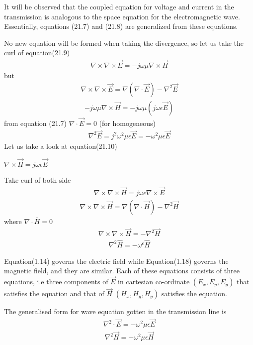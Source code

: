 It will be observed that the coupled equation for voltage and current in the transmission is analogous to the space equation for the electromagnetic wave. Essentially, equations (21.7) and (21.8) are generalized from these equations.

No new equation will be formed when taking the divergence, so let us take the curl of equation(21.9)
\begin{align}
\nabla\times\nabla\times\vec{E}=-j\omega\mu\nabla\times\vec{H}
\end{align}
but 
\begin{align}
\nabla\times\nabla\times\vec{E}=\nabla(\nabla\cdot\vec{E}) - \nabla^2\vec{E}
\end{align}
\begin{align}
-j\omega\mu\nabla\times \vec{H}=-j\omega\mu(j\omega\epsilon\vec{E})
\end{align}
from equation (21.7) $\nabla\cdot\vec{E}=0$ (for homogeneous)
\begin{align}
\nabla^2\vec{E}=j^2\omega^2\mu\epsilon\vec{E}=-\omega^2\mu\epsilon\vec{E}
\end{align}
Let us take a look at equation(21.10)

$\nabla\times\vec{H}=j\omega\epsilon\vec{E}$

Take curl of both side
\begin{align}
\nabla\times\nabla\times\vec{H}=j\omega\epsilon\nabla\times\vec{E}
\end{align}
\begin{align}
\nabla\times\nabla\times\vec{H}=\nabla(\nabla\cdot\vec{H})-\nabla^2\vec{H}
\end{align}
where $\nabla\cdot\bar{H}=0$
\begin{align}
\nabla\times\nabla\times\vec{H}=-\nabla^2\vec{H}
\end{align}
\begin{align}
\nabla^2 \hat{H}=-\omega^\epsilon \hat{H}
\end{align}

Equation(1.14) governs the electric field while Equation(1.18) governs the magnetic field, and they are similar. Each of these equations consists of three equations, i.e three components of $\vec{E}$ in cartesian co-ordinate $(E_{x}, E_{y}, E_{y})$ that satisfies the equation and that of $\vec{H}$ $(H_{x},H_{y},H_{y})$ satisfies the equation.

The generalised form for wave equation gotten in the transmission line is
\begin{align}
\nabla^2\cdot\vec{E}=-\omega^2\mu\epsilon\vec{E}
\end{align}
\begin{align}
\nabla^2\vec{H}=-\omega^2\mu\epsilon\vec{H}
\end{align}

